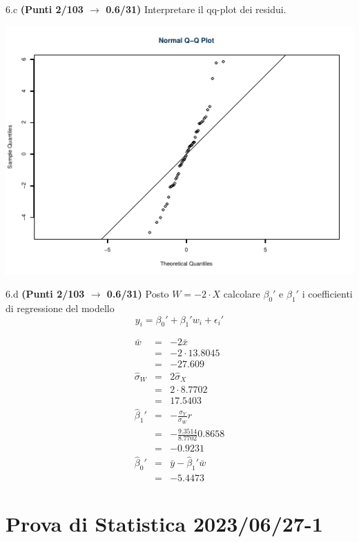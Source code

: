 \documentclass[
  11pt,
]{book}
\theoremstyle{mytheoremstyle}
\theoremstyle{mydefstyle}
\newenvironment{sol}
  {
  \begin{tcolorbox}[enhanced,breakable,arc=0.1mm,boxrule=1pt,colback=white,colframe=iblue,
  title=\bf \fontfamily{lmss}\selectfont \hspace{.5 cm} Soluzione,drop fuzzy shadow]

}{
\end{tcolorbox}
  }
\begin{document}
6.c \textbf{(Punti 2/103 \(\rightarrow\) 0.6/31)} Interpretare il qq-plot dei residui.

\begin{center}\includegraphics{Esami_passati_con_soluzioni_files/figure-latex/2023-56,-1} \end{center}

6.d \textbf{(Punti 2/103 \(\rightarrow\) 0.6/31)} Posto \(W=-2\cdot X\) calcolare \(\beta_0'\) e \(\beta_1'\) i coefficienti di regressione del modello
\[
y_i = \beta_0'+\beta_1'w_i+\epsilon_i'
\]

\begin{sol}
\begin{eqnarray*}
  \bar w &=&  -2\bar x\\
  &=& -2\cdot13.8045\\
  &=& -27.609\\
  \hat\sigma_W&=&2\hat\sigma_X\\
  &=& 2\cdot8.7702\\
  &=& 17.5403\\
  \hat\beta_1' &=& -\frac{\sigma_Y}{\sigma_W}r\\
  &=& -\frac{9.3514}{8.7702}0.8658\\
  &=& -0.9231\\
  \hat\beta_0'&=& \bar y - \hat\beta_1'\bar w\\
  &=& -5.4473
\end{eqnarray*}

\end{sol}

\section{Prova di Statistica 2023/06/27-1}\label{prova-di-statistica-20230627-1}
\end{document}
